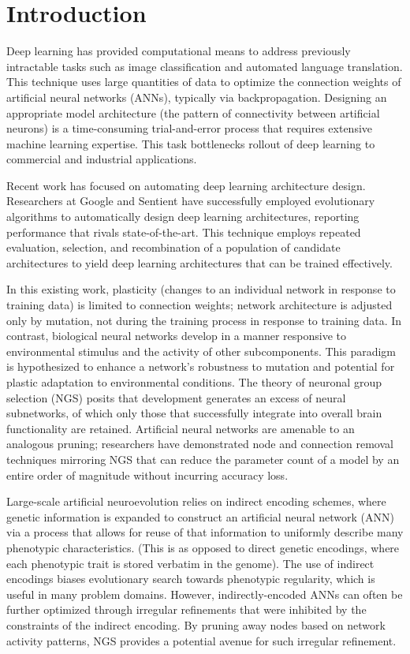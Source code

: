 \section{Introduction}

Deep learning has provided computational means to address previously intractable tasks such as image classification and automated language translation.
This technique uses large quantities of data to optimize the connection weights of artificial neural networks (ANNs), typically via backpropagation.
Designing an appropriate model architecture (the pattern of connectivity between artificial neurons) is a time-consuming trial-and-error process that requires extensive machine learning expertise.
This task bottlenecks rollout of deep learning to commercial and industrial applications.

Recent work has focused on automating deep learning architecture design.
Researchers at Google\autocite{real2017large} and Sentient\autocite{miikkulainen2017evolving} have successfully employed evolutionary algorithms to automatically design deep learning architectures, reporting performance that rivals state-of-the-art.
This technique employs repeated evaluation, selection, and recombination of a population of candidate architectures to yield deep learning architectures that can be trained effectively.

In this existing work, plasticity (changes to an individual network in response to training data) is limited to connection weights;
network architecture is adjusted only by mutation, not during the training process in response to training data.
In contrast, biological neural networks develop in a manner responsive to environmental stimulus and the activity of other subcomponents.
This paradigm is hypothesized to enhance a network's robustness to mutation and potential for plastic adaptation to environmental conditions.\autocite{downing2015intelligence}
The theory of neuronal group selection (NGS) posits that development generates an excess of neural subnetworks, of which only those that successfully integrate into overall brain functionality are retained.\autocite{sanes2011development}
Artificial neural networks are amenable to an analogous pruning;
researchers have demonstrated node and connection removal techniques mirroring NGS that can reduce the parameter count of a model by an entire order of magnitude without incurring accuracy loss.\autocite{song2015learning}

Large-scale artificial neuroevolution relies on indirect encoding schemes, where genetic information is expanded to construct an artificial neural network (ANN) via a process that allows for reuse of that information to uniformly describe many phenotypic characteristics.
(This is as opposed to direct genetic encodings, where each phenotypic trait is stored verbatim in the genome).
The use of indirect encodings biases evolutionary search towards phenotypic regularity, which is useful in many problem domains.
However, indirectly-encoded ANNs can often be further optimized through irregular refinements that were inhibited by the constraints of the indirect encoding.\autocite{clune2011performance}
By pruning away nodes based on network activity patterns, NGS provides a potential avenue for such irregular refinement.

